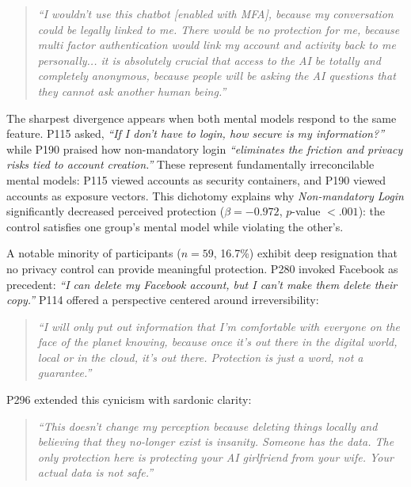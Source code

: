 \documentclass[letterpaper,twocolumn,10pt]{article}
\begin{document}
\begin{quote}
\textit{``I wouldn't use this chatbot [enabled with MFA], because my conversation could be legally linked to me. There would be no protection for me, because multi factor authentication would link my account and activity back to me personally... it is absolutely crucial that access to the AI be totally and completely anonymous, because people will be asking the AI questions that they cannot ask another human being.''}
\end{quote}

 The sharpest divergence appears when both mental models respond to the same feature. P115 asked, \textit{``If I don't have to login, how secure is my information?''} while P190 praised how non-mandatory login \textit{``eliminates the friction and privacy risks tied to account creation.''} These represent fundamentally irreconcilable mental models: P115 viewed accounts as security containers, and P190 viewed accounts as exposure vectors. This dichotomy explains why \emph{Non-mandatory Login} significantly decreased perceived protection ($\beta = -0.972$, $p$-value $< .001$): the control satisfies one group's mental model while violating the other's.

 A notable minority of participants ($n=59$, 16.7\%) exhibit deep resignation that no privacy control can provide meaningful protection. P280 invoked Facebook as precedent: \textit{``I can delete my Facebook account, but I can't make them delete their copy.''} P114 offered a perspective centered around irreversibility:

\begin{quote}
\textit{``I will only put out information that I'm comfortable with everyone on the face of the planet knowing, because once it's out there in the digital world, local or in the cloud, it's out there. Protection is just a word, not a guarantee.''}
\end{quote}

P296 extended this cynicism with sardonic clarity:

\begin{quote}
\textit{``This doesn't change my perception because deleting things locally and believing that they no-longer exist is insanity. Someone has the data. The only protection here is protecting your AI girlfriend from your wife. Your actual data is not safe.''}
\end{quote}
\end{document}
